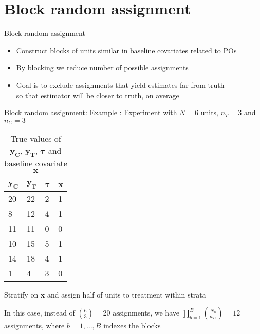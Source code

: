 \documentclass[table, xcolor = {dvipsnames}, 9pt]{beamer}
\theoremstyle{plain}
\newcommand{\bh}[1]{{\color{blue}{#1}}}
\begin{document}
\section{Block random assignment}
\begin{frame}{Block random assignment}
\vfill
\begin{itemize} \vfill
\item Construct blocks of units similar in baseline covariates related to POs \vfill
\item By blocking we reduce number of possible assignments \vfill
\item Goal is to exclude assignments that yield estimates far from truth \\ so that estimator will be closer to truth, on average \vfill
\end{itemize} \vfill
\end{frame}
\begin{frame}{Block random assignment: Example}
\vfill
\bh{Example}: Experiment with $N = 6$ units, $n_T = 3$ and $n_C = 3$
\begin{table}[H]
\centering{}
    \begin{tabular}{l|l|l|l}
    $\bm{y_C}$ & $\bm{y_T}$ & $\bm{\tau}$ & $\bm{x}$ \\ \hline
  20 & 22 & 2 & 1 \\
  8 & 12 & 4 & 1 \\
  11 & 11 & 0 & 0 \\
  10 & 15 & 5 & 1 \\
  14 & 18 & 4 & 1 \\
  1 &  4 & 3 & 0 \\
    \end{tabular}
\caption{True values of $\bm{y_C}$, $\bm{y_T}$, $\bm{\tau}$ and baseline covariate $\bm{x}$}
\end{table} \vfill
Stratify on $\bm{x}$ and assign half of units to treatment within strata \vfill

In this case, instead of $\binom{6}{3} = 20$ assignments, we have $\prod \limits_{b = 1}^B \binom{N_b}{n_{Tb}} = 12$ assignments, where $b = 1, \ldots , B$ indexes the blocks \vfill
\end{frame}
\end{document}
